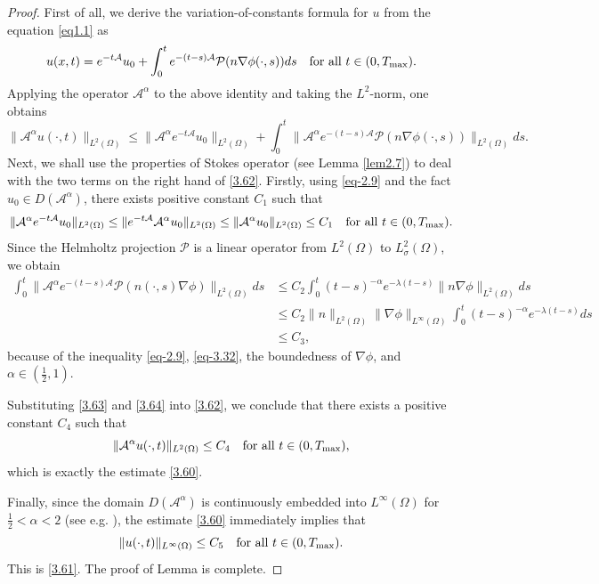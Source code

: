 \documentclass[reqno]{amsart}
\begin{document}
\begin{proof} 
First of all, we derive the variation-of-constants formula for $u$ from the equation 
\eqref{eq1.1} as
\[
u(x,t) = e^{-t \mathcal{A}} u_0 + \int_{0}^t e^{-(t - s) \mathcal{A}} 
\mathcal{P}(n\nabla \phi(\cdot, s)) ds \quad \text{for all } t \in (0, T_{\rm max}).
\]
Applying the operator $\mathcal{A}^\alpha$ to the above identity and taking the 
$L^2$-norm, one obtains
\begin{equation} \label{3.62}
\| \mathcal{A}^\alpha u(\cdot, t) \|_{L^2(\Omega)}
\leq \| \mathcal{A}^\alpha e^{-t\mathcal{A}} u_0 \|_{L^2(\Omega)}
+ \int_0^t \|\mathcal{A}^{\alpha} e^{-(t - s)\mathcal{A}} \mathcal{P}(n \nabla
\phi(\cdot, s))\|_{L^2(\Omega)} ds.
\end{equation}
Next, we shall use the properties of Stokes operator (see Lemma \ref{lem2.7})
to deal with the two terms on the right hand of \eqref{3.62}. Firstly,
using \eqref{eq-2.9} and the fact $u_0 \in D(\mathcal{A}^\alpha)$, there exists
positive constant $C_1$ such that
\begin{equation}\label{3.63}
\|\mathcal{A}^\alpha e^{-t\mathcal{A}} u_0\|_{L^2(\Omega)}
\leq \| e^{-t\mathcal{A}}\mathcal{A}^\alpha u_0\|_{L^2(\Omega)}
 \leq \|\mathcal{A}^\alpha u_0\|_{L^2(\Omega)} \leq C_1 \quad \text{for
all } t \in (0, T_{\rm max}).
\end{equation}
Since the Helmholtz projection $\mathcal{P}$ is a linear operator from $L^2(\Omega)$
to $L_\sigma^2(\Omega)$, we obtain
\begin{equation}\label{3.64}
\begin{split}
\int_0^t \|\mathcal{A}^{\alpha} e^{-(t - s)\mathcal{A}} \mathcal{P}(n(\cdot, s)
  \nabla \phi)\|_{L^2(\Omega)} ds
&\le C_2  \int_0^t (t - s)^{-\alpha} e^{-\lambda (t - s)}
 \|n\nabla \phi\|_{L^2(\Omega)} ds\\
&\le C_2 \|n\|_{L^2(\Omega)} \|\nabla\phi\|_{L^\infty(\Omega)}
 \int_0^t (t - s)^{-\alpha} e^{-\lambda (t - s)} ds \\
& \le C_3,
\end{split}
\end{equation}
because of the inequality \eqref{eq-2.9}, \eqref{eq-3.32},  the boundedness of
$\nabla\phi$, and $\alpha\in (\frac{1}{2}, 1)$.

Substituting \eqref{3.63} and \eqref{3.64} into \eqref{3.62}, we conclude that there 
exists a positive constant $C_4$ such that
\[
\|\mathcal{A}^\alpha u(\cdot, t)\|_{L^2(\Omega)} \leq C_4 \quad 
\text{for all } t \in (0, T_{\rm max}),
\]
which is exactly the estimate \eqref{3.60}.

Finally, since the domain $D(\mathcal{A}^\alpha)$ is continuously embedded into 
$L^\infty(\Omega)$ for $\frac{1}{2}< \alpha<2$ (see e.g. \cite{Sohr-2001}),
the estimate \eqref{3.60} immediately implies that
\[
\| u(\cdot, t) \|_{L^\infty(\Omega)} \leq C_5 \quad \text{for all } 
t \in (0, T_{\rm max}).
\]
This is \eqref{3.61}.  The proof of Lemma is complete.
\end{proof}
\end{document}
